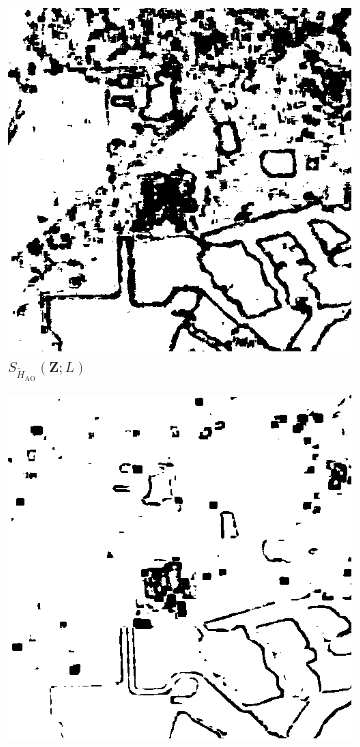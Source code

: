 \begin{figure}[H]
  \centering
  \begin{subfigure}[b]{0.3\textwidth}
    \centering
    \includegraphics[width=\textwidth]{../../Figures/PNG/H_005_lake_512_36L_AO_100b}
    \caption{$S_{\widetilde{H}_{\text{AO}}}(\bm{Z}; L)$}
    \label{fig:lake_0.05-1}
  \end{subfigure}
  \hfill
  \begin{subfigure}[b]{0.3\textwidth}
    \centering
    \includegraphics[width=\textwidth]{../../Figures/PNG/cv_005_pvalues_lake_512}

\end{subfigure}
\end{figure}
